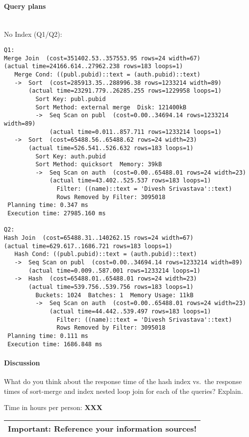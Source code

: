 \documentclass[11pt]{scrartcl}
\begin{document}
\paragraph{Query plans}\mbox{}\\ 

\noindent No Index (Q1/Q2):
{\small
\begin{verbatim}
Q1:
Merge Join  (cost=351402.53..357553.95 rows=24 width=67)
(actual time=24166.614..27962.238 rows=183 loops=1)
   Merge Cond: ((publ.pubid)::text = (auth.pubid)::text)
   ->  Sort  (cost=285913.35..288996.38 rows=1233214 width=89)
       (actual time=23291.779..26285.255 rows=1229958 loops=1)
         Sort Key: publ.pubid
         Sort Method: external merge  Disk: 121400kB
         ->  Seq Scan on publ  (cost=0.00..34694.14 rows=1233214 width=89)
             (actual time=0.011..857.711 rows=1233214 loops=1)
   ->  Sort  (cost=65488.56..65488.62 rows=24 width=23)
       (actual time=526.541..526.632 rows=183 loops=1)
         Sort Key: auth.pubid
         Sort Method: quicksort  Memory: 39kB
         ->  Seq Scan on auth  (cost=0.00..65488.01 rows=24 width=23)
             (actual time=43.402..525.537 rows=183 loops=1)
               Filter: ((name)::text = 'Divesh Srivastava'::text)
               Rows Removed by Filter: 3095018
 Planning time: 0.347 ms
 Execution time: 27985.160 ms

Q2:
Hash Join  (cost=65488.31..140262.15 rows=24 width=67)
(actual time=629.617..1686.721 rows=183 loops=1)
   Hash Cond: ((publ.pubid)::text = (auth.pubid)::text)
   ->  Seq Scan on publ  (cost=0.00..34694.14 rows=1233214 width=89)
       (actual time=0.009..587.001 rows=1233214 loops=1)
   ->  Hash  (cost=65488.01..65488.01 rows=24 width=23)
       (actual time=539.756..539.756 rows=183 loops=1)
         Buckets: 1024  Batches: 1  Memory Usage: 11kB
         ->  Seq Scan on auth  (cost=0.00..65488.01 rows=24 width=23)
             (actual time=44.442..539.497 rows=183 loops=1)
               Filter: ((name)::text = 'Divesh Srivastava'::text)
               Rows Removed by Filter: 3095018
 Planning time: 0.111 ms
 Execution time: 1686.848 ms
\end{verbatim}
}

\paragraph{Discussion}

What do you think about the response time of the hash index vs.\ the
response times of sort-merge and index nested loop join for each of
the queries? Explain.

\bigskip

\noindent Time in hours per person: {\bf XXX}

\bigskip

\begin{center}
  \begin{tabular}{c}
    \hline
    {\bf Important:} Reference your information sources!
    \\\hline
  \end{tabular}
\end{center}
\end{document}

